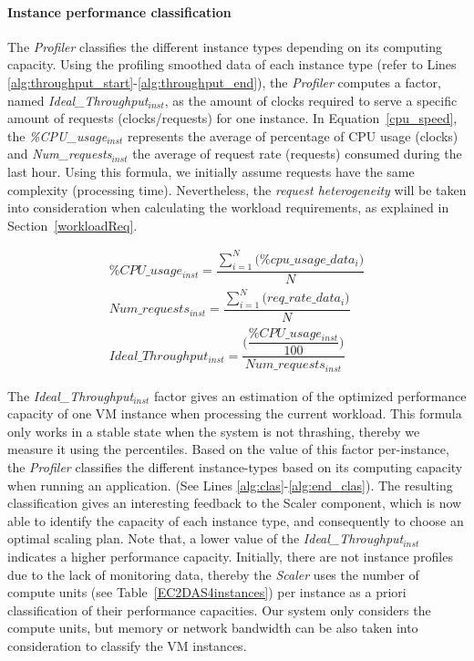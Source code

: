 \paragraph{Instance performance classification} The \emph{Profiler} classifies the different instance types depending on its computing capacity. Using the profiling smoothed data of each instance type (refer to Lines \ref{alg:throughput_start}-\ref{alg:throughput_end}), the \emph{Profiler} computes a factor, named \emph{Ideal\_Throughput$_{inst}$}, as the amount of clocks required to serve a specific amount of requests (clocks/requests)  for one instance. In Equation~\ref{cpu_speed}, the \emph{\%CPU\_usage$_{inst}$} represents the average of percentage of CPU usage (clocks) and \emph{Num\_requests$_{inst}$} the average of request rate (requests) consumed during the last hour. Using this formula, we initially assume requests have the same complexity (processing time). Nevertheless, the \emph{request heterogeneity} will be taken into consideration when calculating the workload requirements, as explained in Section~\ref{workloadReq}.


\vspace{-5mm}
{\scriptsize
\begin{equation}\label{cpu_speed}
\begin{split}
\% CPU\_usage_{inst} = \dfrac{   \sum_{i=1}^N \big( \% cpu\_usage\_data_{i}  \big) } { N } \\
Num\_requests_{inst} = \dfrac{   \sum_{i=1}^N \big( req\_rate\_data_{i} \big) } { N } \\
Ideal\_Throughput_{inst} =\dfrac{ \bigg( \dfrac{\% CPU\_usage_{inst} } { 100 }  \bigg) } {  Num\_requests_{inst}   } 
\end{split}
\end{equation}
}

The \emph{Ideal\_Throughput$_{inst}$} factor gives an estimation of the optimized performance capacity of one VM instance when processing the current workload. This formula only works in a stable state when the system is not thrashing, thereby we measure it using the percentiles. Based on the value of this factor per-instance, the \emph{Profiler} classifies the different instance-types based on its computing capacity when running an application. (See Lines \ref{alg:clas}-\ref{alg:end_clas}). The resulting classification gives an interesting feedback to the Scaler component, which is now able to identify the capacity of each instance type, and consequently to choose an optimal scaling plan. Note that, a lower value of the \emph{Ideal\_Throughput$_{inst}$} indicates a higher performance capacity. Initially, there are not instance profiles due to the lack of monitoring data, thereby the \emph{Scaler} uses the number of compute units (see Table~\ref{EC2DAS4instances}) per instance as a priori classification of their performance capacities. Our system only considers the compute units, but memory or network bandwidth can be also taken into consideration to classify the VM instances.

